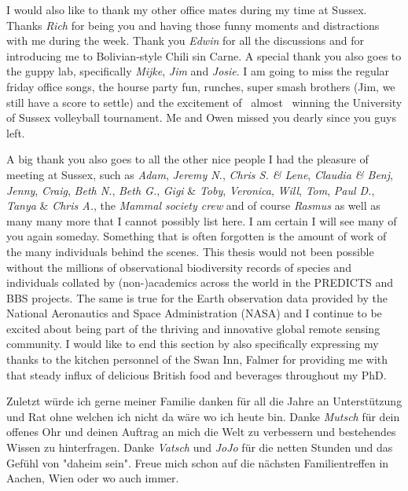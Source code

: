 I would also like to thank my other office mates during my time at Sussex. Thanks \textit{Rich} for being you and having those funny moments and distractions with me during the week. Thank you \textit{Edwin} for all the discussions and for introducing me to Bolivian-style Chili sin Carne. A special thank you also goes to the guppy lab, specifically \textit{Mijke}, \textit{Jim} and \textit{Josie}. I am going to miss the regular friday office songs, the hourse party fun, runches, super smash brothers (Jim, we still have a score to settle) and the excitement of \textendash\ almost \textendash\ winning the University of Sussex volleyball tournament. Me and Owen missed you dearly since you guys left.

A big thank you also goes to all the other nice people I had the pleasure of meeting at Sussex, such as \textit{Adam}, \textit{Jeremy N.}, \textit{Chris S. \& Lene}, \textit{Claudia \& Benj}, \textit{Jenny}, \textit{Craig}, \textit{Beth N.}, \textit{Beth G.}, \textit{Gigi} \& \textit{Toby}, \textit{Veronica}, \textit{Will}, \textit{Tom}, \textit{Paul D.}, \textit{Tanya} \& \textit{Chris A.}, the \textit{Mammal society crew} and of course \textit{Rasmus} as well as many many more that I cannot possibly list here. I am certain I will see many of you again someday. Something that is often forgotten is the amount of work of the many individuals behind the scenes. This thesis would not been possible without the millions of observational biodiversity records of species and individuals collated by (non-)academics across the world in the PREDICTS and BBS projects. The same is true for the Earth observation data provided by the National Aeronautics and Space Administration (NASA) and I continue to be excited about being part of the thriving and innovative global remote sensing community. I would like to end this section by also specifically expressing my thanks to the kitchen personnel of the Swan Inn, Falmer for providing me with that steady influx of delicious British food and beverages throughout my PhD. 

Zuletzt w\"{u}rde ich gerne meiner Familie danken für all die Jahre an Unterstützung und Rat ohne welchen ich nicht da w\"{a}re wo ich heute bin. Danke \textit{Mutsch} f\"{u}r dein offenes Ohr und deinen Auftrag an mich die Welt zu verbessern und bestehendes Wissen zu hinterfragen. Danke \textit{Vatsch} und \textit{JoJo} f\"{u}r die netten Stunden und das Gef\"{u}hl von "daheim sein". Freue mich schon auf die n\"{a}chsten Familientreffen in Aachen, Wien oder wo auch immer. 